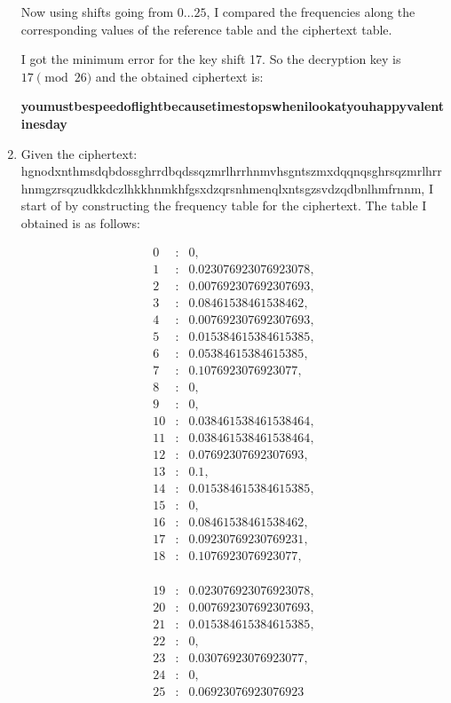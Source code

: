 \documentclass{ashoka-crypto}
\begin{document}
\begin{enumerate}[label=(\alph*)]
 
Now using shifts going from $0\dots 25$, I compared the frequencies along the corresponding values of the reference table and the ciphertext table.

I got the minimum error for the key shift 17. So the decryption key is $17 \pmod {26}$ and the obtained ciphertext is:

\textbf{youmustbespeedoflightbecausetimestopswhenilookatyouhappyvalentinesday}

\item Given the ciphertext: hgnodxnthmsdqbdossghrrdbqdssqzmrlhrrhnmvhsgntszmxdqqnqsghrsqzmrlhrrhnmgzrsqzudkkdczlhkkhnmkhfgsxdzqrsnhmenqlxntsgzsvdzqdbnlhmfrnnm, I start of by constructing the frequency table for the ciphertext. The table I obtained is as follows:

\[
\begin{array}{rcl}
0 & : & 0, \\
1 & : & 0.023076923076923078, \\
2 & : & 0.007692307692307693, \\
3 & : & 0.08461538461538462, \\
4 & : & 0.007692307692307693, \\
5 & : & 0.015384615384615385, \\
6 & : & 0.05384615384615385, \\
7 & : & 0.1076923076923077, \\
8 & : & 0, \\
9 & : & 0, \\
10 & : & 0.038461538461538464, \\
11 & : & 0.038461538461538464, \\
12 & : & 0.07692307692307693, \\
13 & : & 0.1, \\
14 & : & 0.015384615384615385, \\
15 & : & 0, \\
16 & : & 0.08461538461538462, \\
17 & : & 0.09230769230769231, \\
18 & : & 0.1076923076923077, \\
\end{array}
\]

\[
\begin{array}{rcl}
19 & : & 0.023076923076923078, \\
20 & : & 0.007692307692307693, \\
21 & : & 0.015384615384615385, \\
22 & : & 0, \\
23 & : & 0.03076923076923077, \\
24 & : & 0, \\
25 & : & 0.06923076923076923
\end{array}
\]
 

\end{enumerate}
\end{document}
